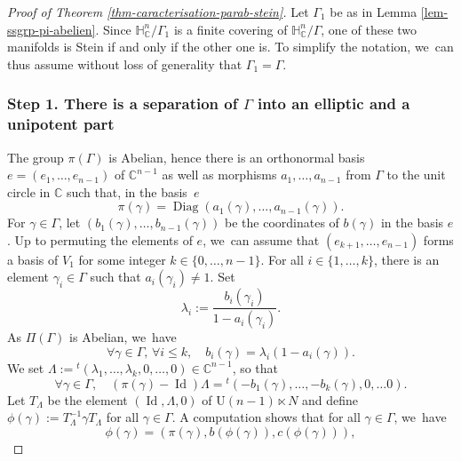 \documentclass[11pt]{article}
\theoremstyle{definition}
\newcommand{\C}{\mathbb{C}}
\newcommand{\HNC}{\mathbb{H}^{n}_{\C}}
\DeclareMathOperator{\Id}{Id}
\DeclareMathOperator{\Diag}{Diag}
\def\C{\mathbb{C}}
\newcommand{\HNC}{\mathbb{H}^{n}_{\C}}
\begin{document}
\begin{proof}[Proof of Theorem \ref{thm-caracterisation-parab-stein}] Let $\Gamma_1$ be as in Lemma \ref{lem-ssgrp-pi-abelien}. Since $\HNC/\Gamma_1$ is a finite covering of $\HNC/\Gamma$, one of these two manifolds is Stein if and only if the other one is. To simplify the notation, we~can thus assume without loss of generality that $\Gamma_1=\Gamma$.

\subsubsection*{Step 1. There is a separation of $\Gamma$ into an elliptic and a unipotent part}

The group $\pi(\Gamma)$ is Abelian, hence there is an orthonormal basis $e=(e_1,\dots,e_{n-1})$ of $\C^{n-1}$ as well as morphisms $a_1,\dots,a_{n-1}$ from $\Gamma$ to the unit circle in $\C$ such that, in the basis~$e$
\begin{equation*}
\pi(\gamma) = \Diag(a_1(\gamma),\dots,a_{n-1}(\gamma)).
\end{equation*}
For $\gamma \in \Gamma$, let $(b_1(\gamma),\dots,b_{n-1}(\gamma))$ be the coordinates of $b(\gamma)$ in the basis $e$.
Up to permuting the elements of $e$, we~can assume that $(e_{k+1},\dots,e_{n-1})$ forms a basis of $V_1$ for some integer $k\in \{0,\dots,n-1\}$. For all $i\in \{1,\dots,k\}$, there is an element $\gamma_i \in \Gamma$ such that $a_i(\gamma_i)\ne 1$. Set
\begin{equation*}
\lambda_i:= \frac{b_i(\gamma_i)}{1-a_i(\gamma_i)}.
\end{equation*}
As $\Pi(\Gamma)$ is Abelian, we~have
\begin{equation*}
\forall \gamma \in \Gamma,\, \forall i\le k,\quad b_i(\gamma)=\lambda_i(1-a_i(\gamma)).
\end{equation*}
We set $\Lambda:= {}^{t}(\lambda_1,\dots,\lambda_k,0,\dots,0) \in \C^{n-1}$, so that
\begin{equation*}
\forall \gamma \in \Gamma,\quad (\pi(\gamma)-\Id)\Lambda = {}^{t}(-b_1(\gamma),\dots,-b_k(\gamma),0,\dots 0).
\end{equation*}
Let $T_{\Lambda}$ be the element $(\Id,\Lambda,0)$ of $\mathrm{U}(n-1)\ltimes N$ and define $\phi(\gamma):=T_{\Lambda}^{-1}\gamma T_{\Lambda}$ for all $\gamma \in \Gamma$. A computation shows that for all $\gamma\in \Gamma$, we~have
\begin{equation*}
\phi(\gamma) = (\pi(\gamma),b(\phi(\gamma)),c(\phi(\gamma))),
\end{equation*}

\end{proof}
\end{document}
